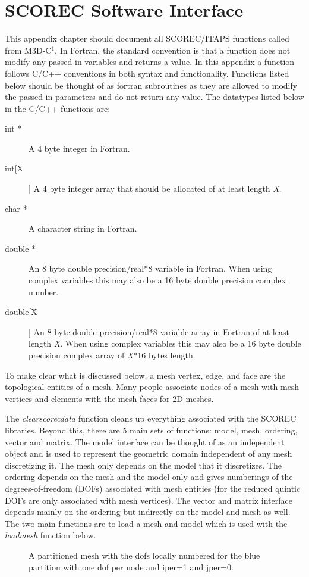 \chapter{SCOREC Software Interface}
This appendix chapter should document all SCOREC/ITAPS functions called from M3D-C$^1$. 
  In Fortran, the standard convention
is that a function does not modify any passed in variables and returns a value. 
In this appendix a function follows C/C++ conventions in both syntax and functionality. 
Functions listed below should be thought of as fortran subroutines as they are allowed
to modify the passed in parameters and do not return any value. 
The datatypes listed below in the C/C++ functions are:
\begin{description}
\item[int *] A 4 byte integer in Fortran.
\item[int[X]] A 4 byte integer array that should be allocated of at least length \textit{X}.
\item[char *] A character string in Fortran.
\item[double *] An 8 byte double precision/real*8 variable in Fortran. When using complex variables this may also be a 16 byte double precision complex number.  
\item[double[X]]  An 8 byte double precision/real*8 variable array in Fortran of at least length \textit{X}.  When using complex variables this may also be a 16 byte double precision complex array of \textit{X}*16 bytes length.
\end{description}
To make clear what is discussed below, a mesh vertex, edge, and face are the topological
entities of a mesh.  Many people associate nodes of a mesh with mesh vertices and elements with
the mesh faces for 2D meshes.  

The \textit{clearscorecdata} function cleans up everything associated with the SCOREC libraries.
Beyond this, there are 5 main sets of functions: model, mesh, ordering, vector and matrix.  The model
interface can be thought of as an independent object and is used to represent the geometric domain independent
of any mesh discretizing it.  The mesh only depends on the model that it discretizes.  The ordering
depends on the mesh and the model only and gives numberings of the degrees-of-freedom (DOFs) associated
with mesh entities (for the reduced quintic DOFs are only associated with mesh vertices).  The vector
and matrix interface depends mainly on the ordering but indirectly on the model and mesh as well.
 The two main functions
are to load a mesh and model which is used with the \textit{loadmesh} function below.  
\begin{center}
\begin{figure}
\centerline{} %
\caption{A partitioned mesh with the dofs locally numbered for the blue partition with one dof per node and iper=1 and jper=0.}\label{meshpartition} \end{figure}
\end{center}


